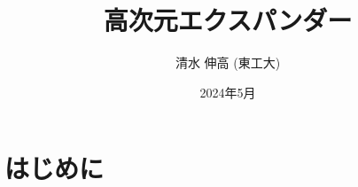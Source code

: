 \documentclass[11pt]{article}
\title{高次元エクスパンダー}
\author{清水 伸高 (東工大)}
\date{2024年5月}
\begin{document}
\maketitle
\tableofcontents
\section{はじめに}
\end{document}
